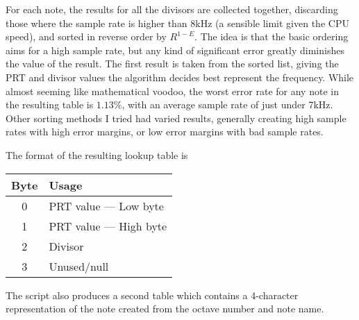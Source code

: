 For each note, the results for all the divisors are collected together, discarding those where the 
sample rate is higher than 8kHz (a sensible limit given the CPU speed), and sorted in reverse order 
by $R^{1-E}$.  The idea is that the basic ordering aims for a high sample rate, but any kind of 
significant error greatly diminishes the value of the result.  The first result is taken from the 
sorted list, giving the PRT and divisor values the algorithm decides best represent the frequency.  
While almost seeming like mathematical voodoo, the worst error rate for any note in the resulting 
table is $1.13\%$, with an average sample rate of just under 7kHz.  Other sorting methods I tried 
had varied results, generally creating high sample rates with high error margins, or low error 
margins with bad sample rates.

The format of the resulting lookup table is

\begin{center}
\begin{tabular}{c l}
Byte & Usage\\
\hline
0 & PRT value --- Low byte\\
1 & PRT value --- High byte\\
2 & Divisor\\
3 & Unused/null\\
\end{tabular}
\end{center}

The script also produces a second table which contains a 4-character representation of the note 
created from the octave number and note name.
